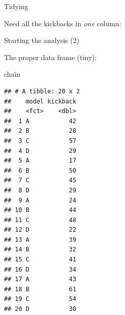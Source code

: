 \documentclass[
  ignorenonframetext,
]{beamer}
\newenvironment{Shaded}{\begin{snugshade}}{\end{snugshade}}
\newcommand{\DataTypeTok}[1]{\textcolor[rgb]{0.13,0.29,0.53}{#1}}
\newcommand{\KeywordTok}[1]{\textcolor[rgb]{0.13,0.29,0.53}{\textbf{#1}}}
\newcommand{\NormalTok}[1]{#1}
\newcommand{\OperatorTok}[1]{\textcolor[rgb]{0.81,0.36,0.00}{\textbf{#1}}}
\newcommand{\StringTok}[1]{\textcolor[rgb]{0.31,0.60,0.02}{#1}}
\begin{document}
\begin{frame}[fragile]{Tidying}
\protect\hypertarget{tidying}{}

Need all the kickbacks in \emph{one} column:

\begin{Shaded}
\end{Shaded}

\end{frame}

\begin{frame}[fragile]{Starting the analysis (2)}
\protect\hypertarget{starting-the-analysis-2}{}

The proper data frame (tiny):

\tiny

\begin{Shaded}
\begin{Highlighting}[]
\NormalTok{chain }
\end{Highlighting}
\end{Shaded}

\begin{verbatim}
## # A tibble: 20 x 2
##    model kickback
##    <fct>    <dbl>
##  1 A           42
##  2 B           28
##  3 C           57
##  4 D           29
##  5 A           17
##  6 B           50
##  7 C           45
##  8 D           29
##  9 A           24
## 10 B           44
## 11 C           48
## 12 D           22
## 13 A           39
## 14 B           32
## 15 C           41
## 16 D           34
## 17 A           43
## 18 B           61
## 19 C           54
## 20 D           30
\end{verbatim}

\normalsize

\end{frame}
\end{document}

